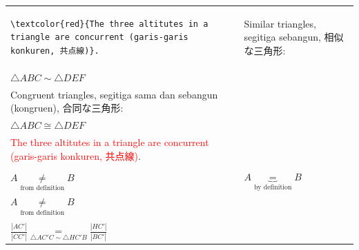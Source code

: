 \documentclass[lualatex]{jlreq}
\begin{document}
\begin{longtable}{p{\cwD} p{\cwE}}
\begin{adjustbox}{valign=t,minipage=\cwD}
\begin{lstlisting}[language={[LaTeX] TeX},numbers=none,frame=none,breaklines=true,aboveskip=0em,belowskip=0em,gobble=8,]
        \textcolor{red}{The three altitutes in a triangle are concurrent (garis-garis konkuren, 共点線)}.
        \end{lstlisting}
    \end{adjustbox}
                     &
    \begin{adjustbox}{valign=t,minipage=\cwE}
        Similar triangles, segitiga \mbox{sebangun}, 相似な三角形:\\
        \(\triangle{ABC} \sim \triangle{DEF}\)\\
        Congruent triangles, segitiga sama dan sebangun (kongruen), 合同な三角形:\\
        \(\triangle{ABC} \cong \triangle{DEF}\)\\
        \textcolor{red}{The three altitutes in a triangle are concurrent (garis-garis konkuren, 共点線)}.
    \end{adjustbox}
    \\
    \twocolrowseparatorline{}
    \begin{adjustbox}{valign=t,minipage=\cwD}
        \begin{lstlisting}[language={[LaTeX] TeX},numbers=none,frame=none,breaklines=true,aboveskip=0em,belowskip=0em,gobble=8,]
        \(A \underbrace{=}_{\text{by definition}} B\)\\
        \(A \underset{\text{from definition}}{\neq} B\)
        \end{lstlisting}
    \end{adjustbox}
                     &
    \begin{adjustbox}{valign=t,minipage=\cwE}
        \(A \underbrace{=}_{\text{by definition}} B\)\\
        \(A \underset{\text{from definition}}{\neq} B\)
    \end{adjustbox}
    \\
    \twocolrowseparatorline{}
    \begin{adjustbox}{valign=t,minipage=\cwD}
        \begin{lstlisting}[language={[LaTeX] TeX},numbers=none,frame=none,breaklines=true,aboveskip=0em,belowskip=0em,gobble=8,]
        \(\frac{|AC'|}{|CC'|} \underbrace{=}_{\triangle{AC'C}\sim\triangle{HC'B}} \frac{|HC'|}{|BC'|}\)\\
        \(\frac{|AC'|}{|CC'|} \underset{\triangle{AC'C}\sim\triangle{HC'B}}{=} \frac{|HC'|}{|BC'|}\)
        \end{lstlisting}
    \end{adjustbox}
                     &
    \begin{adjustbox}{valign=t,minipage=\cwE}

\end{adjustbox}
\end{longtable}
\end{document}

